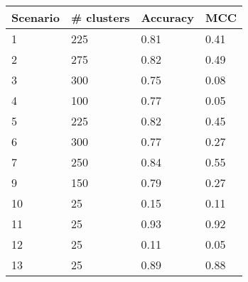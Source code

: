 \begin{tabular}{llll}
\toprule
\textbf{Scenario}   & \textbf{\# clusters}  & \textbf{Accuracy} & \textbf{MCC}    \\
\midrule
1                   & 225                   & 0.81              & 0.41            \\ %
2                   & 275                   & 0.82              & 0.49            \\ %
3                   & 300                   & 0.75              & 0.08            \\ %
4                   & 100                   & 0.77              & 0.05            \\ %
5                   & 225                   & 0.82              & 0.45            \\ %
6                   & 300                   & 0.77              & 0.27            \\ %
7                   & 250                   & 0.84              & 0.55            \\ %
9                   & 150                   & 0.79              & 0.27            \\ %
10                  & 25                    & 0.15              & 0.11            \\ %
11                  & 25                    & 0.93              & 0.92            \\ %
12                  & 25                    & 0.11              & 0.05            \\ %
13                  & 25                    & 0.89              & 0.88            \\ %
\bottomrule
\end{tabular}